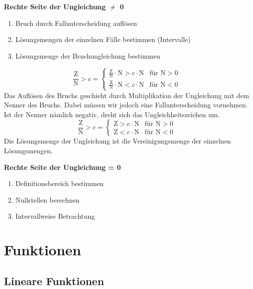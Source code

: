 \begin{multicols}{2}
    \textbf{Rechte Seite der Ungleichung $\neq$ 0}
    \begin{enumerate}
        \item Bruch durch Fallunterscheidung auflösen
        \item Lösungsmengen der einzelnen Fälle bestimmen (Intervalle)
        \item Lösungsmenge der Bruchungleichung bestimmen
    \end{enumerate}
    \begin{equation*} \frac{\text{Z}}{\text{N}} > c = \begin{cases} \frac{\text{Z}}{\text{N}} \cdot \text{N} > c \cdot \text{N} &\text{für } \text{N} > 0 \\[5px] \frac{\text{Z}}{\text{N}} \cdot \text{N} < c \cdot \text{N} &\text{für } \text{N} < 0 \end{cases} \end{equation*}
    Das Auflösen des Bruchs geschieht durch Multiplikation der Ungleichung mit dem Nenner des Bruchs. Dabei müssen wir jedoch eine Fallunterscheidung vornehmen. Ist der Nenner nämlich negativ, dreht sich das Ungleichheitszeichen um.
    \begin{equation*} \frac{\text{Z}}{\text{N}} > c = \begin{cases} \text{Z} > c \cdot \text{N} &\text{für } \text{N} > 0 \\[5px] \text{Z} < c \cdot \text{N} &\text{für } \text{N} < 0 \end{cases} \end{equation*}
    Die Lösungsmenge der Ungleichung ist die Vereinigungsmenge der einzelnen Lösungsmengen.


    \textbf{Rechte Seite der Ungleichung = 0}
    \begin{enumerate}
        \item Definitionsbereich bestimmen
        \item Nullstellen berechnen
        \item Intervallweise Betrachtung
    \end{enumerate}

    \newpage


    \section{Funktionen}
    \vspace{-4mm}
    \subsection{Lineare Funktionen}
    \vspace{-4mm}

\end{multicols}

